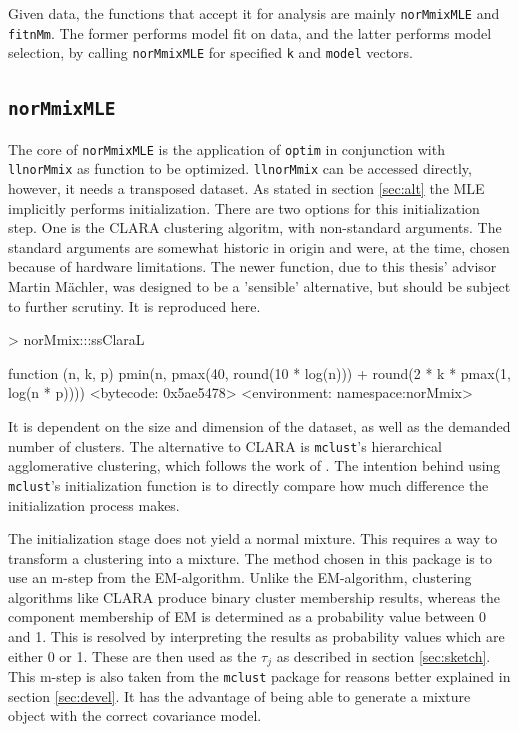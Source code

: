 Given data, the functions that accept it for analysis are mainly 
{\tt norMmixMLE} and {\tt fitnMm}. The former performs model fit on data, and 
the latter performs model selection, by calling {\tt norMmixMLE} for specified
{\tt k} and {\tt model} vectors. 

\subsection{{\tt norMmixMLE}}

The core of {\tt norMmixMLE} is the application of {\tt optim} in conjunction
with {\tt llnorMmix} as function to be optimized. {\tt llnorMmix} can be 
accessed directly, however, it needs a transposed dataset.
As stated in section \ref{sec:alt} the MLE implicitly performs initialization.
There are two options for this initialization step. One is the CLARA clustering
algoritm, with non-standard arguments. The standard arguments are somewhat 
historic in origin and were, at the time, chosen because of hardware 
limitations. The newer function, due to this thesis' advisor Martin M\"achler, 
was designed to be a 'sensible' alternative, but should be subject to further 
scrutiny. It is reproduced here.

\begin{Schunk}
\begin{Sinput}
>     norMmix:::ssClaraL
\end{Sinput}
\begin{Soutput}
function (n, k, p) 
pmin(n, pmax(40, round(10 * log(n))) + round(2 * k * pmax(1, 
    log(n * p))))
<bytecode: 0x5ae5478>
<environment: namespace:norMmix>
\end{Soutput}
\end{Schunk}

It is dependent on the size and dimension of the dataset, as well as the 
demanded number of clusters.
The alternative to CLARA is {\tt mclust}'s hierarchical agglomerative 
clustering, which follows the work of \cite{Fra98}. The intention behind using 
{\tt mclust}'s initialization function is to directly compare how much 
difference the initialization process makes.

The initialization stage does not yield a normal mixture. This requires a way
to transform a clustering into a mixture. The method chosen in this package is
to use an m-step from the EM-algorithm. Unlike the EM-algorithm, clustering 
algorithms like CLARA produce binary cluster membership results, whereas the 
component membership of EM is determined as a probability value between 0 and 1.
This is resolved by interpreting the results as probability values which are 
either 0 or 1. These are then used as the $\tau_j$ as described in section 
\ref{sec:sketch}. This m-step is also taken from the {\tt mclust} package for 
reasons better explained in section \ref{sec:devel}.
It has the advantage of being able to generate a mixture object with the 
correct covariance model.

